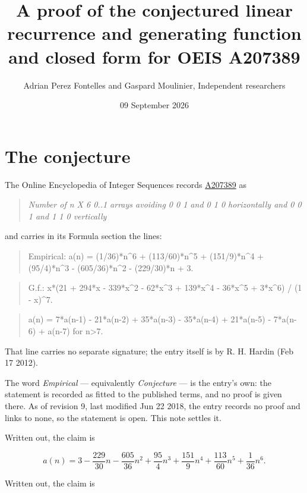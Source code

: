 \documentclass[11pt]{article}
\title{A proof of the conjectured linear recurrence and generating function and closed form for OEIS A207389}
\author{Adrian Perez Fontelles and Gaspard Moulinier, Independent researchers}
\date{09 September 2026}
\theoremstyle{definition}
\begin{document}
\maketitle
\section{The conjecture}

The Online Encyclopedia of Integer Sequences records \href{https://oeis.org/A207389}{A207389} as

\begin{quote}\itshape Number of n X 6 0..1 arrays avoiding 0 0 1 and 0 1 0 horizontally and 0 0 1 and 1 1 0 vertically\end{quote}

and carries in its Formula section the lines:

\begin{quote}\ttfamily Empirical: a(n) = (1/36)*n\textasciicircum{}6 + (113/60)*n\textasciicircum{}5 + (151/9)*n\textasciicircum{}4 + (95/4)*n\textasciicircum{}3 - (605/36)*n\textasciicircum{}2 - (229/30)*n + 3.\end{quote}

\begin{quote}\ttfamily G.f.: x*(21 + 294*x - 339*x\textasciicircum{}2 - 62*x\textasciicircum{}3 + 139*x\textasciicircum{}4 - 36*x\textasciicircum{}5 + 3*x\textasciicircum{}6) / (1 - x)\textasciicircum{}7.\end{quote}

\begin{quote}\ttfamily a(n) = 7*a(n-1) - 21*a(n-2) + 35*a(n-3) - 35*a(n-4) + 21*a(n-5) - 7*a(n-6) + a(n-7) for n>7.\end{quote}

That line carries no separate signature; the entry itself is by R. H. Hardin (Feb 17 2012).

The word {\itshape Empirical} --- equivalently {\itshape Conjecture} --- is the entry's own: the statement is recorded as fitted to the published terms, and no proof is given there. As of revision 9, last modified Jun 22 2018, the entry records no proof and links to none, so the statement is open. This note settles it.

Written out, the claim is

\[a(n) = 3 - \frac{229}{30}n - \frac{605}{36}n^{2} + \frac{95}{4}n^{3} + \frac{151}{9}n^{4} + \frac{113}{60}n^{5} + \frac{1}{36}n^{6}.\]

Written out, the claim is
\end{document}

